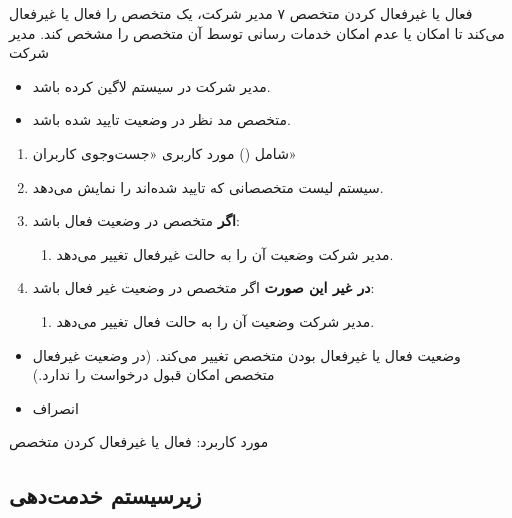 {
\usecase
{فعال یا غیرفعال کردن متخصص}
{۷}
{مدیر شرکت، یک متخصص را فعال یا غیرفعال می‌کند تا امکان یا عدم امکان خدمات رسانی توسط آن متخصص را مشخص کند.}
{مدیر شرکت}
{}
{
\begin{itemize}
	\item 
	مدیر شرکت در سیستم لاگین کرده باشد.
	
	\item
	متخصص مد نظر در وضعیت تایید شده باشد.
\end{itemize}
}
{
\begin{enumerate}
	\item 
	شامل () مورد کاربری «جست‌وجوی کاربران»
	\item
	سیستم لیست متخصصانی که تایید شده‌اند را نمایش می‌دهد.
	
	\item
	\textbf{اگر} متخصص در وضعیت فعال باشد:
	\begin{enumerate}
		\item 
		مدیر شرکت وضعیت آن را به حالت غیرفعال تغییر می‌دهد.
	\end{enumerate}

\item
	\textbf{در غیر این صورت } اگر متخصص در وضعیت غیر فعال باشد:
\begin{enumerate}[label=\theenumi.\arabic*.]
	\item 
	مدیر شرکت وضعیت آن را به حالت فعال تغییر می‌دهد.
\end{enumerate}
\end{enumerate}
}
{\begin{itemize}
		\item وضعیت فعال یا غیرفعال بودن متخصص تغییر می‌کند. (در وضعیت غیرفعال متخصص امکان قبول درخواست را ندارد.)
\end{itemize}}
{
\begin{itemize}
	\item انصراف
\end{itemize}
}
{مورد کاربرد: فعال یا غیرفعال کردن متخصص}



}

\newpage
\subsection{زیرسیستم خدمت‌دهی}

